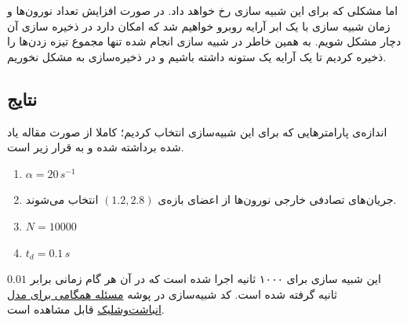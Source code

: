 اما مشکلی که برای این شبیه سازی رخ خواهد داد. در صورت افزایش تعداد نورون‌ها و زمان شبیه سازی با یک ابر آرایه روبرو خواهیم شد که امکان دارد در ذخیره سازی آن دچار مشکل شویم. به همین خاطر در شبیه سازی انجام شده تنها مجموع تیزه زدن‌ها را ذخیره کردیم تا یک آرایه یک ستونه داشته باشیم و در ذخیره‌سازی به مشکل نخوریم.

\subsection{نتایج}
اندازه‌ی پارامتر‌هایی که برای این شبیه‌سازی انتخاب کردیم؛ کاملا از صورت مقاله یاد شده برداشته شده و به قرار زیر است.
\begin{tcolorbox}[colback=green!5!white,colframe=green!75!black]
	\begin{enumerate}[*]
		\item
		$\alpha = 20\, s^{-1}$
		\item
		جریان‌های تصادفی خارجی نورون‌ها از اعضای بازه‌ی $(1.2,2.8)$ انتخاب می‌شوند.
		\item
		$N = 10000$
		\item
		$t_d = 0.1\, s$ 
	\end{enumerate}
\end{tcolorbox}
این شبیه سازی برای ۱۰۰۰ ثانیه اجرا شده است که در آن هر گام زمانی برابر $0.01$ ثانیه گرفته شده است. کد شبیه‌سازی در پوشه 
\href{run://..//scripts//kuramoto_model_synchoronization_problem}{مسئله همگامی برای مدل انباشت‌و‌شلیک}
قابل مشاهده است.
